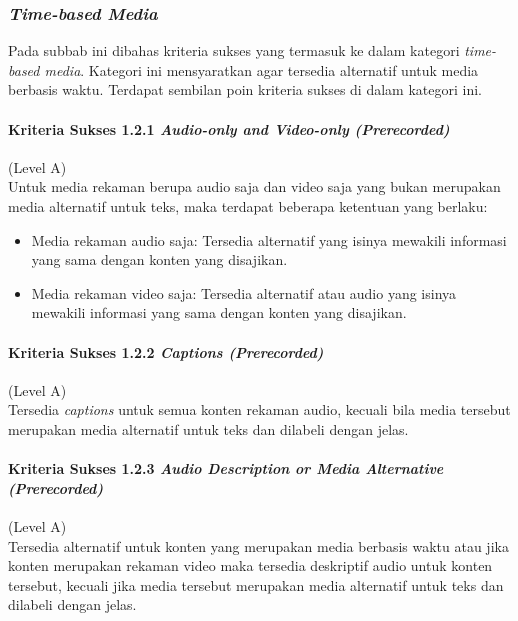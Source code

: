 \subsubsection{\textit{Time-based Media}}
\label{sec:time_based_media}
Pada subbab ini dibahas kriteria sukses yang termasuk ke dalam kategori \textit{time-based media}. Kategori ini mensyaratkan agar tersedia alternatif untuk media berbasis waktu. Terdapat sembilan poin kriteria sukses di dalam kategori ini.

\paragraph{Kriteria Sukses 1.2.1 \textit{Audio-only and Video-only (Prerecorded)}}
\label{sec:kriteria_sukses_1.2.1}
(Level A)\\

Untuk media rekaman berupa audio saja dan video saja yang bukan merupakan media alternatif untuk teks, maka terdapat beberapa ketentuan yang berlaku: 
\begin{itemize}
	\item Media rekaman audio saja: Tersedia alternatif yang isinya mewakili informasi yang sama dengan konten yang disajikan.
	\item Media rekaman video saja: Tersedia alternatif atau audio yang isinya mewakili informasi yang sama dengan konten yang disajikan.
\end{itemize}

\paragraph{Kriteria Sukses 1.2.2 \textit{Captions (Prerecorded)}}
\label{sec:kriteria_sukses_1.2.2}
(Level A)\\

Tersedia \textit{captions} untuk semua konten rekaman audio, kecuali bila media tersebut merupakan media alternatif untuk teks dan dilabeli dengan jelas.

\paragraph{Kriteria Sukses 1.2.3 \textit{Audio Description or Media Alternative (Prerecorded)}}
\label{sec:kriteria_sukses_1.2.3}
(Level A)\\

Tersedia alternatif untuk konten yang merupakan media berbasis waktu atau jika konten merupakan rekaman video maka tersedia deskriptif audio untuk konten tersebut, kecuali jika media tersebut merupakan media alternatif untuk teks dan dilabeli dengan jelas.

